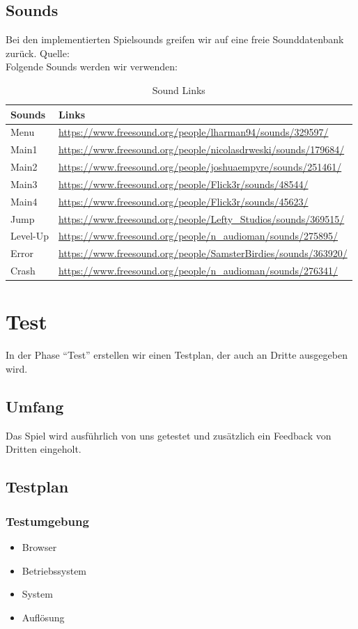 \subsection{Sounds}
Bei den implementierten Spielsounds greifen wir auf eine freie Sounddatenbank zurück. Quelle: \cite{sounds}\\
Folgende Sounds werden wir verwenden:
\begin{table}[h]
	\centering
	\begin{tabular}{|l|l|}
		\toprule
		\textbf{Sounds}& \textbf{Links}\\
		\midrule
		Menu & \url{https://www.freesound.org/people/lharman94/sounds/329597/}\\ 
		Main1 & \url{https://www.freesound.org/people/nicolasdrweski/sounds/179684/}\\
		Main2  & \url{https://www.freesound.org/people/joshuaempyre/sounds/251461/}\\ 
		Main3  & \url{https://www.freesound.org/people/Flick3r/sounds/48544/}\\
		Main4 & \url{https://www.freesound.org/people/Flick3r/sounds/45623/}\\
		Jump & \url{https://www.freesound.org/people/Lefty_Studios/sounds/369515/}\\
		Level-Up & \url{https://www.freesound.org/people/n_audioman/sounds/275895/}\\
		Error & \url{https://www.freesound.org/people/SamsterBirdies/sounds/363920/}\\
		Crash & \url{https://www.freesound.org/people/n_audioman/sounds/276341/}\\
		\bottomrule
	\end{tabular}
	\caption{Sound Links}
\end{table}
\section{Test}
In der Phase ``Test'' erstellen wir einen Testplan, der auch an Dritte ausgegeben wird.
\subsection{Umfang}
Das Spiel wird ausführlich von uns getestet und zusätzlich ein Feedback von Dritten eingeholt.
\subsection{Testplan}
\subsubsection{Testumgebung}
\begin{itemize}
	\item Browser
	\item Betriebssystem
	\item System
	\item Auflösung
\end{itemize}
